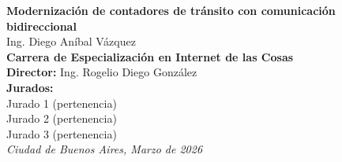 \begin{titlepage}

    \begin{flushright}
        \setlength{\rightskip}{-2cm} %
        \vspace*{7.5cm} %

        {\bfseries\fontsize{33pt}{40pt}\selectfont
      Modernización de contadores de tránsito con comunicación bidireccional} \\[1.5cm]

        {\fontsize{20pt}{25pt}\selectfont
        Ing. Diego Aníbal Vázquez} \\[1cm]

        {\fontsize{15pt}{20pt}\selectfont
        \textbf{Carrera de Especialización en Internet de las Cosas}
        } \\[2cm]

        {\fontsize{11pt}{15pt}\selectfont
        \textbf{Director:} Ing. Rogelio Diego González} \\[1cm]

        {\fontsize{11pt}{15pt}\selectfont
        \textbf{Jurados:}} \\[0.5cm]
        {\fontsize{11pt}{15pt}\selectfont
        Jurado 1 (pertenencia)} \\ 
        {\fontsize{11pt}{15pt}\selectfont
        Jurado 2 (pertenencia)} \\ 
        {\fontsize{11pt}{15pt}\selectfont
        Jurado 3 (pertenencia)} \\[2cm]

        {\itshape\fontsize{10pt}{12pt}\selectfont
        Ciudad de Buenos Aires, Marzo de 2026} %
    \end{flushright}
\end{titlepage}
